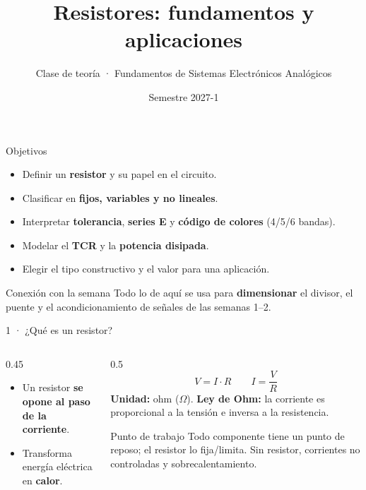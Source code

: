 \documentclass[aspectratio=169]{beamer}
\title[Resistores]{Resistores: fundamentos y aplicaciones}
\subtitle{Clase de teoría · Fundamentos de Sistemas Electrónicos Analógicos}
\institute{Licenciatura en Ingeniería Aeroespacial · UNAM}
\date{Semestre 2027-1}
\begin{document}
\begin{frame}[plain]
  \titlepage
\end{frame}

\begin{frame}{Objetivos}
  \begin{itemize}
    \item Definir un \textbf{resistor} y su papel en el circuito.
    \item Clasificar en \textbf{fijos, variables y no lineales}.
    \item Interpretar \textbf{tolerancia}, \textbf{series E} y \textbf{código de colores} (4/5/6 bandas).
    \item Modelar el \textbf{TCR} y la \textbf{potencia disipada}.
    \item Elegir el tipo constructivo y el valor para una aplicación.
  \end{itemize}
  \pause
  \begin{block}{Conexión con la semana}
    Todo lo de aquí se usa para \textbf{dimensionar} el divisor, el puente y el
    acondicionamiento de señales de las semanas 1–2.
  \end{block}
\end{frame}

\begin{frame}{1 · ¿Qué es un resistor?}
  \begin{columns}[T]
    \begin{column}{0.45\textwidth}
      \begin{center}
      \end{center}
      \begin{itemize}
        \item Un resistor \textbf{se opone al paso de la corriente}.
        \item Transforma energía eléctrica en \textbf{calor}.
      \end{itemize}
    \end{column}
    \begin{column}{0.5\textwidth}
      \[
        V = I\cdot R
        \qquad
        I = \frac{V}{R}
      \]
      \textbf{Unidad:} ohm ($\Omega$). \textbf{Ley de Ohm:} la corriente es
      proporcional a la tensión e inversa a la resistencia.
      \pause
      \begin{block}{Punto de trabajo}
        Todo componente tiene un punto de reposo; el resistor lo fija/limita.
        Sin resistor, corrientes no controladas y sobrecalentamiento.
      \end{block}
    \end{column}
  \end{columns}
\end{frame}
\end{document}
